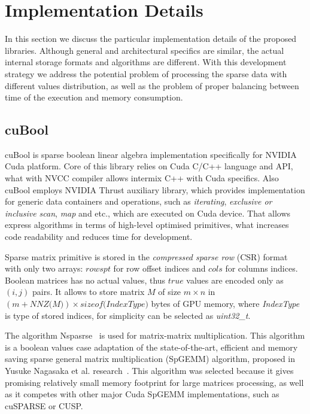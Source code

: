 \section{Implementation Details}

In this section we discuss the particular implementation details of the proposed libraries. Although general and architectural specifics are similar, the actual internal storage formats and algorithms are different. With this development strategy we address the potential problem of processing the sparse data with different values distribution, as well as the problem of proper balancing between time of the execution and memory consumption. 

\subsection{cuBool}

cuBool is sparse boolean linear algebra implementation specifically for NVIDIA Cuda platform. Core of this 
library relies on Cuda C/C++ language and API, what with NVCC compiler allows intermix C++ with Cuda 
specifics. Also cuBool employs NVIDIA Thrust auxiliary library, which provides 
implementation for generic data containers and operations, such as \textit{iterating}, \textit{exclusive or 
inclusive scan}, \textit{map} and etc., which are executed on Cuda device. That allows express algorithms in 
terms of high-level optimised primitives, what increases code readability and reduces time for development.

Sparse matrix primitive is stored in the \textit{compressed sparse row} (CSR) format with only two arrays: 
$rowspt$ for row offset indices and $cols$ for columns indices. Boolean matrices has no actual values, thus 
$true$ values are encoded only as $(i, j)$ pairs. It allows to store matrix $M$ of size $m \times n$ 
in $(m + \textit{NNZ(M)}) \times \textit{sizeof(IndexType)}$ bytes of GPU memory, where 
\textit{IndexType} is type of stored indices, for simplicity can be selected as \textit{uint32\_t}.

The algorithm Nspasrse~\cite{inproceedings:cfpq_for_redis_graph} is used for matrix-matrix multiplication. 
This algorithm is a boolean values case 
adaptation of the state-of-the-art, efficient and memory saving sparse general matrix multiplication (SpGEMM) 
algorithm, proposed in Yusuke Nagasaka et al. research~\cite{algo:spgemm:8025284}. This algorithm was selected because it 
gives promising relatively small memory footprint for large matrices processing, as well as it competes with 
other major Cuda SpGEMM implementations, such as cuSPARSE or CUSP.  

